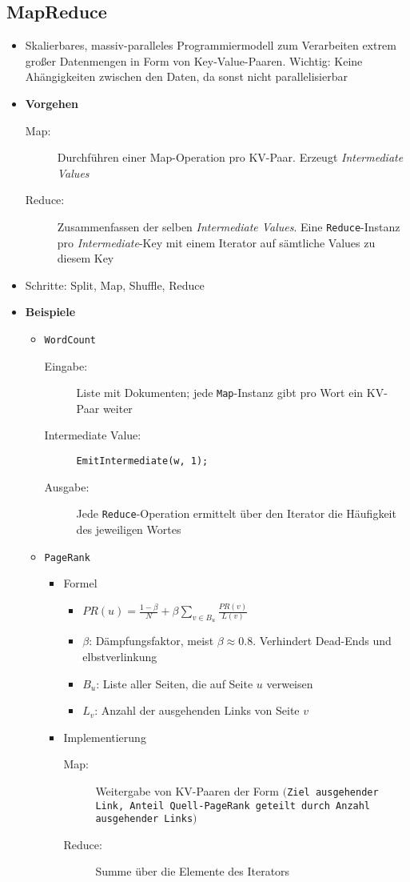 \subsection{MapReduce}
\begin{itemize}
	\item Skalierbares, massiv-paralleles Programmiermodell zum Verarbeiten extrem großer Datenmengen in Form von Key-Value-Paaren. Wichtig: Keine Ahängigkeiten zwischen den Daten, da sonst nicht parallelisierbar
	\item \textbf{Vorgehen}
	\begin{description}
		\item[Map:] Durchführen einer Map-Operation pro KV-Paar. Erzeugt \textit{Intermediate Values}
		\item[Reduce:] Zusammenfassen der selben \textit{Intermediate Values}. Eine \texttt{Reduce}-Instanz pro \textit{Intermediate}-Key mit einem Iterator auf sämtliche Values zu diesem Key
	\end{description}
	\item Schritte: Split, Map, Shuffle, Reduce
	\item \textbf{Beispiele}
	\begin{itemize}
		\item \texttt{WordCount}
		\begin{description}
			\item[Eingabe:] Liste mit Dokumenten; jede \texttt{Map}-Instanz gibt pro Wort ein KV-Paar weiter
			\item[Intermediate Value:] \texttt{EmitIntermediate(w, 1);}
			\item[Ausgabe:] Jede \texttt{Reduce}-Operation ermittelt über den Iterator die Häufigkeit des jeweiligen Wortes
		\end{description}
		\item \texttt{PageRank}
		\begin{itemize}
			\item Formel
			\begin{itemize}
				\item \(PR(u) = \frac{1-\beta}{N} + \beta \sum_{v \in B_u}\frac{PR(v)}{L(v)}\)
				\item \(\beta\): Dämpfungsfaktor, meist \(\beta \approx 0.8\). Verhindert Dead-Ends und elbstverlinkung
				\item \(B_u\): Liste aller Seiten, die auf Seite \(u\) verweisen
				\item \(L_v\): Anzahl der ausgehenden Links von Seite \(v\)
			\end{itemize}
			\item Implementierung
			\begin{description}
				\item[Map:] Weitergabe von KV-Paaren der Form \texttt{\(\big(\)Ziel ausgehender Link, Anteil Quell-PageRank geteilt durch Anzahl ausgehender Links\(\big)\)}
				\item[Reduce:] Summe über die Elemente des Iterators
			\end{description}
		\end{itemize}
	\end{itemize}
\end{itemize}



